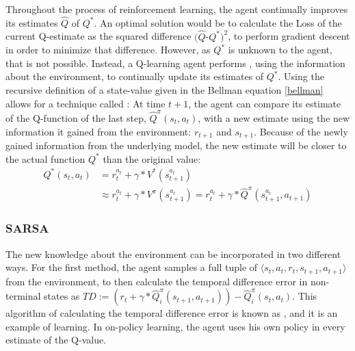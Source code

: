 Throughout the process of reinforcement learning, the agent continually improves its estimates $\hat{Q}$ of $Q^*$. An optimal solution would be to calculate the Loss of the current Q-estimate as the squared difference $(\hat{Q}$-$Q^*)^2$, to perform gradient descent in order to minimize that difference. However, as $Q^*$ is unknown to the agent, that is not possible. Instead, a Q-learning agent performs , using the information about the environment, to continually update its estimates of $Q^*$.
\noindent Using the recursive definition of a state-value given in the Bellman equation \ref{bellman} allows for a technique called \cite{sutton1988}: At time $t+1$, the agent can compare its estimate of the Q-function of the last step, $\hat{Q}^\pi(s_t, a_t)$, with a new estimate using the new information it gained from the environment: $r_{t+1}$ and $s_{t+1}$.  Because of the newly gained information from the underlying model, the new estimate will be closer to the actual function $Q^*$ than the original value:
\begin{align} 
Q^*(s_t,a_t) &= r_t^{a_t} + \gamma * V^*(s_{t+1}^{a_t})\\
&\approx r_t^{a_t} + \gamma * V^\pi(s_{t+1}^{a_t}) = r_t^{a_t} + \gamma * \hat{Q}^\pi(s_{t+1}^{a_t},a_{t+1}) 
\end{align}

\subsubsection{\textsc{SARSA}}
The new knowledge about the environment can be incorporated in two different ways. For the first method, the agent samples a full tuple of $\langle s_t, a_t, r_t, s_{t+1}, a_{t+1} \rangle$ from the environment, to then calculate the temporal difference error in non-terminal states as $ TD := (r_t + \gamma * \hat{Q}_i^\pi(s_{t+1}, a_{t+1})) - \hat{Q}_i^\pi(s_t, a_t)  $. This algorithm of calculating the temporal difference error is known as  , and it is an example of  learning. In on-policy learning, the agent uses his own policy in every estimate of the Q-value. 

